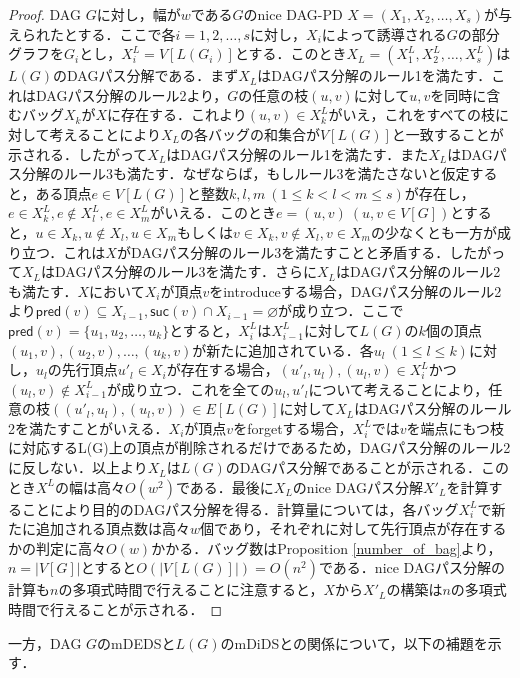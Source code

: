 \documentclass[master]{kuisthesis}		%
\theoremstyle{plain}
\theoremstyle{definition}
\begin{document}
\begin{proof}
    DAG $G$に対し，幅が$w$である$G$のnice DAG-PD $X=(X_1, X_2, \dots, X_s)$が与えられたとする．ここで各$i=1, 2, \dots, s$に対し，$X_i$によって誘導される$G$の部分グラフを$G_i$とし，$X^L_i = V[L(G_i)]$とする．このとき$X_L=(X^L_1, X^L_2, \dots, X^L_s)$は$L(G)$のDAGパス分解である．まず$X_L$はDAGパス分解のルール1を満たす．これはDAGパス分解のルール2より，$G$の任意の枝$(u, v)$に対して$u, v$を同時に含むバッグ$X_k$が$X$に存在する．これより$(u, v)\in X^L_k$がいえ，これをすべての枝に対して考えることにより$X_L$の各バッグの和集合が$V[L(G)]$と一致することが示される．したがって$X_L$はDAGパス分解のルール1を満たす．また$X_L$はDAGパス分解のルール3も満たす．なぜならば，もしルール3を満たさないと仮定すると，ある頂点$e\in V[L(G)]$と整数$k, l, m\ (1 \leq k < l < m \leq s)$が存在し，$e\in X^L_k, e\notin X^L_l, e\in X^L_m$がいえる．このとき$e=(u, v)\ (u, v \in V[G])$とすると，$u\in X_k, u\notin X_l, u\in X_m$もしくは$v\in X_k, v\notin X_l, v\in X_m$の少なくとも一方が成り立つ．これは$X$がDAGパス分解のルール3を満たすことと矛盾する．したがって$X_L$はDAGパス分解のルール3を満たす．さらに$X_L$はDAGパス分解のルール2も満たす．$X$において$X_i$が頂点$v$をintroduceする場合，DAGパス分解のルール2より$\mathsf{pred}(v)\subseteq X_{i-1}, \mathsf{suc}(v)\cap X_{i-1} = \varnothing$が成り立つ．ここで$\mathsf{pred}(v)=\{u_1, u_2, \dots, u_k\}$とすると，$X^L_i$は$X^L_{i-1}$に対して$L(G)$の$k$個の頂点$(u_1, v), (u_2, v), \dots, (u_k, v)$が新たに追加されている．各$u_l\ (1\leq l \leq k)$に対し，$u_l$の先行頂点$u'_l \in X_i$が存在する場合，$(u'_l, u_l), (u_l, v) \in X^L_i$かつ$(u_l, v) \notin X^L_{i-1}$が成り立つ．これを全ての$u_l, u'_l$について考えることにより，任意の枝$((u'_l, u_l), (u_l, v)) \in E[L(G)]$に対して$X_L$はDAGパス分解のルール2を満たすことがいえる．$X_i$が頂点$v$をforgetする場合，$X^L_i$では$v$を端点にもつ枝に対応するL(G)上の頂点が削除されるだけであるため，DAGパス分解のルール2に反しない．以上より$X_L$は$L(G)$のDAGパス分解であることが示される．このとき$X^L$の幅は高々$O(w^2)$である．最後に$X_L$のnice DAGパス分解$X'_L$を計算することにより目的のDAGパス分解を得る．計算量については，各バッグ$X^L_i$で新たに追加される頂点数は高々$w$個であり，それぞれに対して先行頂点が存在するかの判定に高々$O(w)$かかる．バッグ数はProposition \ref{number_of_bag}より，$n=|V[G]|$とすると$O(|V[L(G)]|)=O(n^2)$である．nice DAGパス分解の計算も$n$の多項式時間で行えることに注意すると，$X$から$X'_L$の構築は$n$の多項式時間で行えることが示される．
\end{proof}

一方，DAG $G$のmDEDSと$L(G)$のmDiDSとの関係について，以下の補題を示す．
\end{document}
